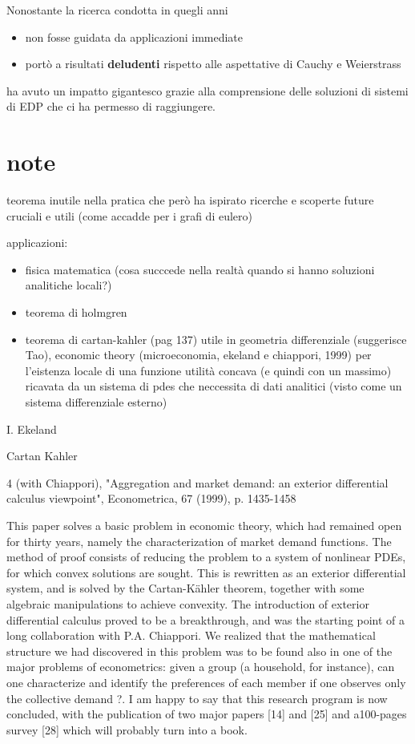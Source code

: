 Nonostante la ricerca condotta in quegli anni
\begin{itemize}
\item non fosse guidata da applicazioni immediate
\item portò a risultati \textbf{deludenti} rispetto alle aspettative di Cauchy e Weierstrass
\end{itemize}
ha avuto un impatto gigantesco grazie alla comprensione delle soluzioni di sistemi di EDP che ci ha permesso di raggiungere.





\newpage
\section{note}

teorema inutile nella pratica che però ha ispirato ricerche e scoperte future cruciali e utili (come accadde per i grafi di eulero)

applicazioni:
\begin{itemize}
\item fisica matematica (cosa succcede nella realtà quando si hanno soluzioni analitiche locali?)
\item teorema di holmgren
\item teorema di cartan-kahler (pag 137) utile in geometria differenziale (suggerisce Tao), economic theory (microeconomia, ekeland e chiappori, 1999) per l'eistenza locale di una funzione utilità concava (e quindi con un massimo) ricavata da un sistema di pdes che neccessita di dati analitici (visto come un sistema differenziale esterno)
\end{itemize}

I. Ekeland

Cartan Kahler

4 (with Chiappori), "Aggregation and market demand: an exterior differential calculus viewpoint", Econometrica, 67 (1999), p. 1435-1458

This paper solves a basic problem in economic theory, which had remained open for thirty years, namely the characterization of market demand functions. The method of proof consists of reducing the problem to a system of nonlinear PDEs, for which convex solutions are sought. This is rewritten as an exterior differential system, and is solved by the Cartan-Kähler theorem, together with some algebraic manipulations to achieve convexity. The introduction of exterior differential calculus proved to be a breakthrough, and was the starting point of a long collaboration with P.A. Chiappori. We realized that the mathematical structure we had discovered in this problem was to be found also in one of the major problems of econometrics: given a group (a household, for instance), can one characterize and identify the preferences of each member if one observes only the collective demand ?. I am happy to say that this research program is now concluded, with the publication of two major papers [14] and [25] and a100-pages survey [28] which will probably turn into a book.

